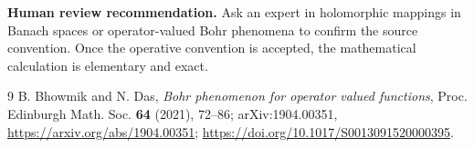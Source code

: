 \documentclass[11pt]{article}
\begin{document}
\textbf{Human review recommendation.} Ask an expert in holomorphic mappings
in Banach spaces or operator-valued Bohr phenomena to confirm the source
convention. Once the operative convention is accepted, the mathematical
calculation is elementary and exact.

\begin{thebibliography}{9}
B. Bhowmik and N. Das,
\emph{Bohr phenomenon for operator valued functions},
Proc. Edinburgh Math. Soc. \textbf{64} (2021), 72--86;
arXiv:1904.00351,
\url{https://arxiv.org/abs/1904.00351};
\url{https://doi.org/10.1017/S0013091520000395}.
\end{thebibliography}
\end{document}

